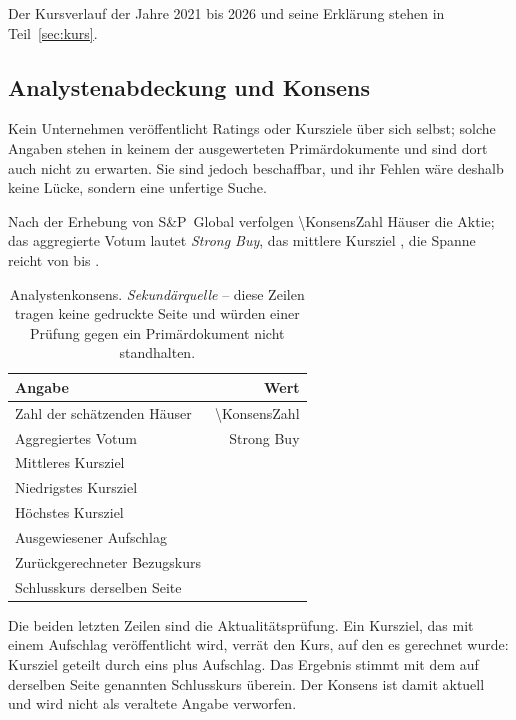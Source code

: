 Der Kursverlauf der Jahre 2021 bis 2026 und seine Erkl\"arung stehen in
Teil~\ref{sec:kurs}.

\subsection{Analystenabdeckung und Konsens}
\label{sec:konsens}

Kein Unternehmen ver\"offentlicht Ratings oder Kursziele \"uber sich selbst;
solche Angaben stehen in keinem der ausgewerteten Prim\"ardokumente und sind
dort auch nicht zu erwarten. Sie sind jedoch beschaffbar, und ihr Fehlen
w\"are deshalb keine L\"ucke, sondern eine unfertige Suche.

Nach der Erhebung von S\&P~Global verfolgen \num{\KonsensZahl} H\"auser die
Aktie; das aggregierte Votum lautet \emph{Strong Buy}, das mittlere Kursziel
\USDje{\KonsensZiel}, die Spanne reicht von \USDje{\KonsensZielTief} bis
\USDje{\KonsensZielHoch}.

\begin{table}[htbp]
\centering
\caption{Analystenkonsens. \emph{Sekund\"arquelle} -- diese Zeilen tragen
keine gedruckte Seite und w\"urden einer Pr\"ufung gegen ein Prim\"ardokument
nicht standhalten.}
\label{tab:konsens}
\begin{tabular}{lr}
\toprule
Angabe & Wert\\
\midrule
Zahl der sch\"atzenden H\"auser & \num{\KonsensZahl}\\
Aggregiertes Votum & Strong Buy\\
Mittleres Kursziel & \USDje{\KonsensZiel}\\
Niedrigstes Kursziel & \USDje{\KonsensZielTief}\\
H\"ochstes Kursziel & \USDje{\KonsensZielHoch}\\
Ausgewiesener Aufschlag & \Pct{\KonsensAufschlag}\\
\midrule
Zur\"uckgerechneter Bezugskurs & \USDje{\KonsensBezugskurs}\\
Schlusskurs derselben Seite & \USDje{\KonsensKurs}\\
\bottomrule
\end{tabular}
\end{table}

\FloatBarrier

Die beiden letzten Zeilen sind die Aktualit\"atspr\"ufung. Ein Kursziel, das
mit einem Aufschlag ver\"offentlicht wird, verr\"at den Kurs, auf den es
gerechnet wurde: Kursziel geteilt durch eins plus Aufschlag. Das Ergebnis
\USDje{\KonsensBezugskurs} stimmt mit dem auf derselben Seite genannten
Schlusskurs \"uberein. Der Konsens ist damit aktuell und wird nicht als
veraltete Angabe verworfen.

